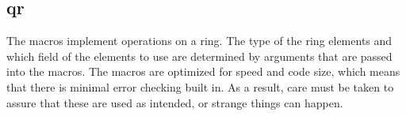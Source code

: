 %
%
%
%
%              

\subsection{qr}
\label{qr}

The  macros implement operations on a ring.  The type of the ring
elements and which field of the elements to use are determined by arguments that
are passed into the macros.  The macros are optimized for speed and code size,
which means that there is minimal error checking built in.  As a result, care
must be taken to assure that these are used as intended, or strange things can
happen.


